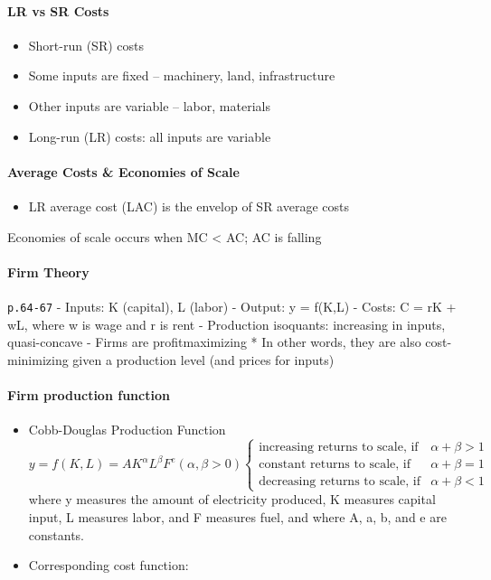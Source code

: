 \documentclass[]{article}
\providecommand{\tightlist}{%
  \setlength{\itemsep}{0pt}\setlength{\parskip}{0pt}}
\let\oldparagraph\paragraph
\renewcommand{\paragraph}[1]{\oldparagraph{#1}\mbox{}}
\begin{document}
\hypertarget{lr-vs-sr-costs}{%
\paragraph{LR vs SR Costs}\label{lr-vs-sr-costs}}

\begin{itemize}
\tightlist
\item
  Short-run (SR) costs
\item
  Some inputs are fixed -- machinery, land, infrastructure
\item
  Other inputs are variable -- labor, materials
\item
  Long-run (LR) costs: all inputs are variable
\end{itemize}

\hypertarget{average-costs-economies-of-scale}{%
\paragraph{Average Costs \& Economies of
Scale}\label{average-costs-economies-of-scale}}

\begin{itemize}
\tightlist
\item
  LR average cost (LAC) is the envelop of SR average costs
\end{itemize}

Economies of scale occurs when MC \textless{} AC; AC is falling

\hypertarget{firm-theory}{%
\paragraph{Firm Theory}\label{firm-theory}}

\texttt{p.64-67} - Inputs: K (capital), L (labor) - Output: y = f(K,L) -
Costs: C = rK + wL, where w is wage and r is rent - Production
isoquants: increasing in inputs, quasi-concave - Firms are
profitmaximizing * In other words, they are also cost-minimizing given a
production level (and prices for inputs)

\hypertarget{firm-production-function}{%
\paragraph{Firm production function}\label{firm-production-function}}

\begin{itemize}
\item
  Cobb-Douglas Production Function
  \[y = f(K,L) = AK^{\alpha}L^{\beta}F^e (\alpha, \beta > 0)\begin{cases}\text{increasing returns to scale, if}&\alpha+\beta > 1\\ \text{constant returns to scale, if}&\alpha+\beta = 1 \\ \text{decreasing returns to scale, if}&\alpha+\beta < 1 \end{cases}\]
  where y measures the amount of electricity produced, K measures
  capital input, L measures labor, and F measures fuel, and where A, a,
  b, and e are constants.
\item
  Corresponding cost function:
\end{itemize}
\end{document}
